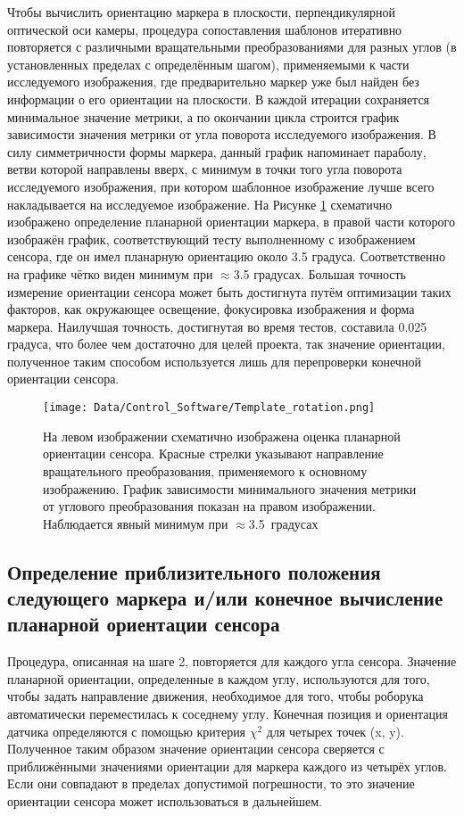 Чтобы вычислить ориентацию маркера в плоскости, перпендикулярной оптической оси камеры, процедура сопоставления шаблонов итеративно повторяется с различными вращательными преобразованиями для разных углов (в установленных пределах с определённым шагом), применяемыми к части исследуемого изображения, где предварительно маркер уже был найден без информации о его ориентации на плоскости. В каждой итерации сохраняется минимальное значение метрики, а по окончании цикла строится график зависимости значения метрики от угла поворота исследуемого изображения. В силу симметричности формы маркера, данный график напоминает параболу, ветви которой направлены вверх, с минимум в точки того угла поворота исследуемого изображения, при котором шаблонное изображение лучше всего накладывается на исследуемое изображение. На Рисунке \ref{fig:template_rotation} схематично изображено определение планарной ориентации маркера, в правой части которого изображён график, соответствующий тесту выполненному с изображением сенсора, где он имел планарную ориентацию около 3.5 градуса. Соответственно на графике чётко виден минимум при $\approx$3.5 градусах. Большая точность измерение ориентации сенсора может быть достигнута путём оптимизации таких факторов, как окружающее освещение, фокусировка изображения и форма маркера. Наилучшая точность, достигнутая во время тестов, составила 0.025 градуса, что более чем достаточно для целей проекта, так значение ориентации, полученное таким способом используется лишь для перепроверки конечной ориентации сенсора.

\begin{figure}[ht]\centering
\texttt{[image: Data/Control\_Software/Template\_rotation.png]}
\caption{На левом изображении схематично изображена оценка планарной ориентации сенсора. Красные стрелки указывают направление вращательного преобразования, применяемого к основному изображению. График зависимости минимального значения метрики от углового преобразования показан на правом изображении. Наблюдается явный минимум при $\approx$3.5~градусах
}
\label{fig:template_rotation}
\end{figure}

\subsection{Определение приблизительного положения следующего маркера и/или конечное вычисление планарной ориентации сенсора}

Процедура, описанная на шаге 2, повторяется для каждого угла сенсора. Значение планарной ориентации, определенные в каждом углу, используются для того, чтобы задать направление движения, необходимое для того, чтобы роборука автоматически переместилась к соседнему углу. Конечная позиция и ориентация датчика определяются с помощью критерия $\chi^{2}$ для четырех точек (x, y). Полученное таким образом значение ориентации сенсора сверяется с приближёнными значениями ориентации для маркера каждого из четырёх углов. Если они совпадают в пределах допустимой погрешности, то это значение ориентации сенсора может использоваться в дальнейшем.

